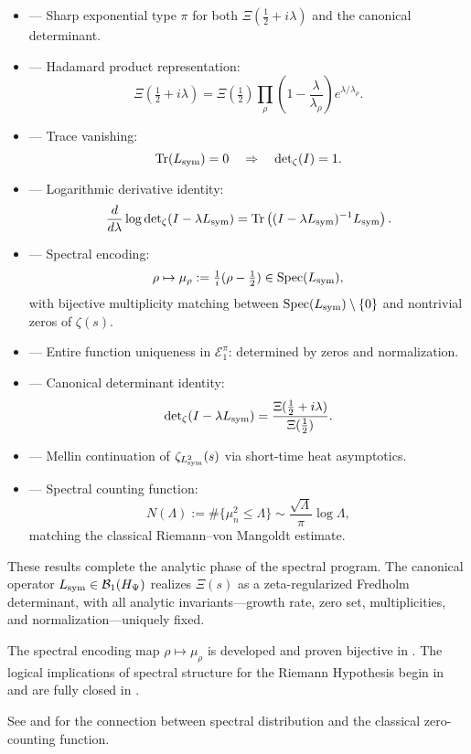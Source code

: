 \begin{itemize}
  \item {} — Sharp exponential type \( \pi \) for both \( \Xi(\tfrac{1}{2} + i\lambda) \) and the canonical determinant.
  \item {} — Hadamard product representation:
  \[
  \Xi\left( \tfrac{1}{2} + i\lambda \right) = \Xi\left( \tfrac{1}{2} \right) \prod_{\rho} \left(1 - \frac{\lambda}{\lambda_\rho}\right) e^{\lambda/\lambda_\rho}.
  \]
  \item {} — Trace vanishing:
  \[
  \operatorname{Tr}(L_{\mathrm{sym}}) = 0 \quad \Rightarrow \quad \det\nolimits_{\zeta}(I) = 1.
  \]
  \item {} — Logarithmic derivative identity:
  \[
  \frac{d}{d\lambda} \log \det\nolimits_{\zeta}(I - \lambda L_{\mathrm{sym}}) = \operatorname{Tr}\left( (I - \lambda L_{\mathrm{sym}})^{-1} L_{\mathrm{sym}} \right).
  \]
  \item {} — Spectral encoding:
  \[
  \rho \mapsto \mu_\rho := \tfrac{1}{i}(\rho - \tfrac{1}{2}) \in \operatorname{Spec}(L_{\mathrm{sym}}),
  \]
  with bijective multiplicity matching between \( \operatorname{Spec}(L_{\mathrm{sym}}) \setminus \{0\} \) and nontrivial zeros of \( \zeta(s) \).
  \item {} — Entire function uniqueness in \( \mathcal{E}_1^\pi \): determined by zeros and normalization.

  \item {} — Canonical determinant identity:
  \[
  \det\nolimits_{\zeta}(I - \lambda L_{\mathrm{sym}}) = \frac{\Xi(\tfrac{1}{2} + i\lambda)}{\Xi(\tfrac{1}{2})}.
  \]

  \item {} — Mellin continuation of \( \zeta_{L_{\mathrm{sym}}^2}(s) \) via short-time heat asymptotics.
  \item {} — Spectral counting function:
  \[
  N(\Lambda) := \#\{ \mu_n^2 \le \Lambda \} \sim \frac{\sqrt{\Lambda}}{\pi} \log \Lambda,
  \]
  matching the classical Riemann--von Mangoldt estimate.
\end{itemize}

\medskip

\noindent
These results complete the analytic phase of the spectral program. The canonical operator \( L_{\mathrm{sym}} \in \mathcal{B}_1(H_{\Psi}) \) realizes \( \Xi(s) \) as a zeta-regularized Fredholm determinant, with all analytic invariants—growth rate, zero set, multiplicities, and normalization—uniquely fixed.

\medskip

\noindent
The spectral encoding map \( \rho \mapsto \mu_\rho \) is developed and proven bijective in . The logical implications of spectral structure for the Riemann Hypothesis begin in  and are fully closed in .

\medskip

\noindent
See  and  for the connection between spectral distribution and the classical zero-counting function.
